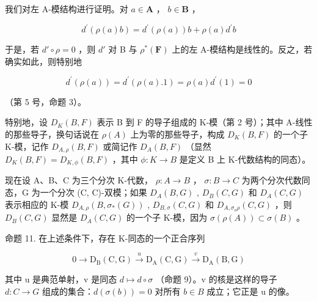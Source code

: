 我们对左 A-模结构进行证明。对 \(a \in \mathbf{A}\) ， \(b \in \mathbf{B}\) ，

\[
d ^ {\prime} (\rho (a) b) = d ^ {\prime} (\rho (a)) b + \rho (a) d ^ {\prime} b
\]

于是，若 \(d' \circ \rho = 0\) ，则 \(d'\) 对 B 与 \(\rho^*(\mathbf{F})\) 上的左 A-模结构是线性的。反之，若确实如此，则特别地

\[
d ^ {\prime} (\rho (a)) = d ^ {\prime} (\rho (a). 1) = \rho (a) d ^ {\prime} (1) = 0
\]

（第 5 号，命题 3）。

特别地，设 \(D_{K}(B,F)\) 表示 B 到 F 的导子组成的 K-模（第 2 号）；其中 A-线性的那些导子，换句话说在 \(\rho(A)\) 上为零的那些导子，构成 \(D_{K}(B,F)\) 的一个子 K-模，记作 \(D_{A,\rho}(B,F)\) 或简记作 \(D_{A}(B,F)\) （显然 \(D_{K}(B,F)=D_{K,\phi}(B,F)\) ，其中 \(\phi:K\to B\) 是定义 B 上 K-代数结构的同态）。

现在设 A、B、C 为三个分次 K-代数， \(\rho:A\to B\) ， \(\sigma:B\to C\) 为两个分次代数同态，G 为一个分次 (C, C)-双模；如果 \(D_{A}(B,G)\) , \(D_{B}(C,G)\) 和 \(D_{A}(C,G)\) 表示相应的 K-模 \(D_{A,\rho}(B,\sigma_{*}(G))\) , \(D_{B,\sigma}(C,G)\) 和 \(D_{A,\sigma_{o}\rho}(C,G)\) ，则 \(D_{B}(C,G)\) 显然是 \(D_{A}(C,G)\) 的一个子 K-模，因为 \(\sigma(\rho(A))\subset\sigma(B)\) 。

命题 11. 在上述条件下，存在 K-同态的一个正合序列

\[
0 \rightarrow \mathrm{D} _ {\mathrm{B}} (\mathrm{C}, \mathrm{G}) \xrightarrow {u} \mathrm{D} _ {\mathrm{A}} (\mathrm{C}, \mathrm{G}) \xrightarrow {v} \mathrm{D} _ {\mathrm{A}} (\mathrm{B}, \mathrm{G})\tag{27}
\]

其中 u 是典范单射，v 是同态 \(d \mapsto d \circ \sigma\) （命题 9）。v 的核是这样的导子 \(d: C \to G\) 组成的集合：\(d(\sigma(b)) = 0\) 对所有 \(b \in B\) 成立；它正是 u 的像。

